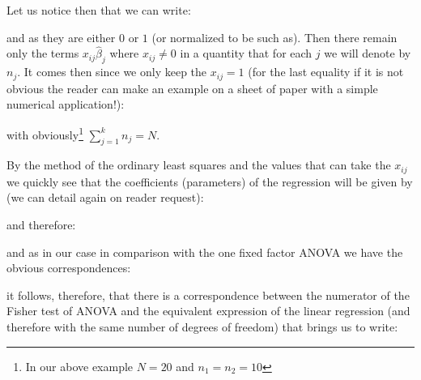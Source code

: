 	Let us notice then that we can write:
	
	and as they are either $0$ or $1$ (or normalized to be such as). Then there remain only the terms $x_{ij}\hat{\beta}_j$ where $x_{ij}\neq 0$ in a quantity that for each $j$ we will denote by $n_j$. It comes then since we only keep the $x_{ij}=1$ (for the last equality if it is not obvious the reader can make an example on a sheet of paper with a simple numerical application!):
	
 	with obviously\footnote{In our above example $N=20$ and $n_1=n_2=10$} $\sum_{j=1}^k n_j=N$.

	By the method of the ordinary least squares and the values that can take the $x_{ij}$ we quickly see that the coefficients (parameters) of the regression will be given by (we can detail again on reader request):
	
	and therefore:
	
	and as in our case in comparison with the one fixed factor ANOVA we have the obvious correspondences:
	
	it follows, therefore, that there is a correspondence between the numerator of the Fisher test of ANOVA and the equivalent expression of the linear regression (and therefore with the same number of degrees of freedom) that brings us to write:
	
